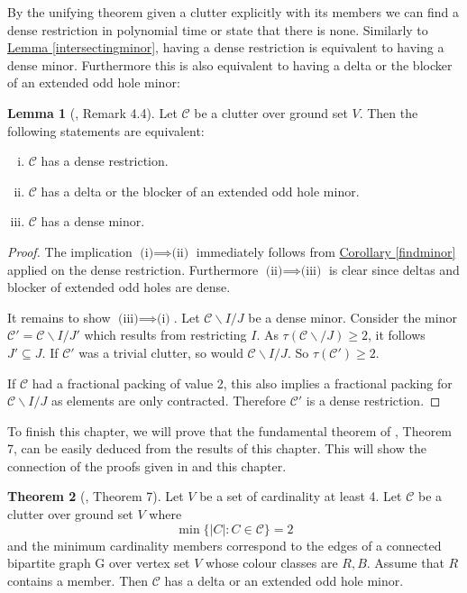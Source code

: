 \documentclass[a4paper, 12pt, twoside=false]{scrbook}
\theoremstyle{definition}
\newtheorem{theorem}{Theorem}[chapter]
\newtheorem{lemma}[theorem]{Lemma}
\begin{document}
   By the unifying theorem given a clutter explicitly with its members we can find a dense restriction in polynomial time or state that there is none. Similarly to \hyperref[intersectingminor]{Lemma \ref*{intersectingminor}}, having a dense restriction is equivalent to having a dense minor. Furthermore this is also equivalent to having a delta or the blocker of an extended odd hole minor:
   \begin{lemma}[\cite{restrictions}, Remark 4.4]
       Let $\mathcal{C}$ be a clutter over ground set $V$. Then the following statements are equivalent:
       \leavevmode
       \begin{enumerate}[(i)]
           \item $\mathcal{C}$ has a dense restriction.
           \item $\mathcal{C}$ has a delta or the blocker of an extended odd hole minor.
           \item $\mathcal{C}$ has a dense minor.
       \end{enumerate}
   \end{lemma}

   \begin{proof}
       The implication $\text{(i)} \implies \text{(ii)}$ immediately follows from \hyperref[findminor]{Corollary \ref*{findminor}} applied on the dense restriction. Furthermore $\text{(ii)} \implies \text{(iii)}$ is clear since deltas and blocker of extended odd holes are dense.

       It remains to show $\text{(iii)} \implies \text{(i)}$. Let $\mathcal{C} \backslash I /J$ be a dense minor. Consider the minor $\mathcal{C'}=\mathcal{C}\backslash I/J'$ which results from restricting $I$. As $\tau(\mathcal{C}\backslash /J)\geq 2$, it follows $J' \subseteq J$. If $\mathcal{C'}$ was a trivial clutter, so would $\mathcal{C} \backslash I/J$. So $\tau(\mathcal{C'})\geq 2$.

       If $\mathcal{C}$ had a fractional packing of value 2, this also implies a fractional packing for $\mathcal{C}\backslash I/J$ as elements are only contracted. Therefore $\mathcal{C'}$ is a dense restriction.
   \end{proof}

   To finish this chapter, we will prove that the fundamental theorem of \cite{deltas}, Theorem 7, can be easily deduced from the results of this chapter. This will show the connection of the proofs given in \cite{deltas} and this chapter.

   \begin{theorem}[\cite{deltas}, Theorem 7]
       Let $V$ be a set of cardinality at least 4. Let $\mathcal{C}$ be a clutter over ground set $V$ where
       \[
           \min\{|C|: C \in \mathcal{C}\} = 2
           \]
           and the minimum cardinality members correspond to the edges of a connected bipartite graph G over vertex set $V$ whose colour classes are $R,B$. Assume that $R$ contains a member. Then $\mathcal{C}$ has a delta or an extended odd hole minor.
   \end{theorem}
\end{document}
